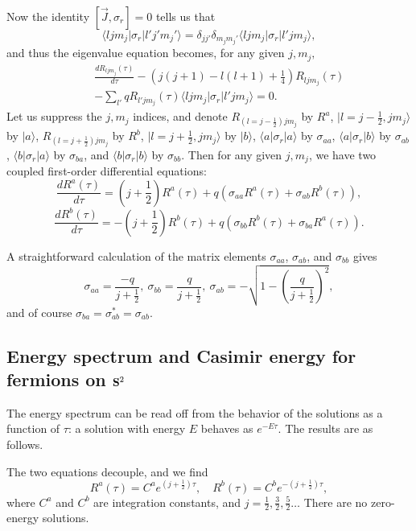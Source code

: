 \documentclass[a4paper,12pt, amsfonts, amssymb]{article}
\begin{document}
Now the identity $\left[\vec{J}, \sigma_r\right]=0$ tells us that
\begin{equation*}
\langle ljm_j\vert\sigma_r\vert l'j'm_j'\rangle= 
\delta_{jj'}\delta_{m_jm_j'}\langle ljm_j\vert\sigma_r\vert l'jm_j\rangle,
\end{equation*}
and thus the eigenvalue equation becomes, for any given $j,m_j,$
\begin{eqnarray}
&\ &
\frac{dR_{ljm_j}(\tau)}{d\tau}-\left(j(j+1)-l(l+1)
+\frac{1}{4}\right)R_{ljm_j}(\tau) \nonumber\\
&\ &- \sum_{l'}q R_{l'jm_j}(\tau)
\langle ljm_j|\sigma_r|l'jm_j\rangle  =0.\nonumber
\end{eqnarray}
Let us suppress the $j,m_j$ indices, and denote 
$R_{(l=j-\frac{1}{2})jm_j}$ by $R^a$, 
$\vert l=j-\frac{1}{2},jm_j\rangle$ by $\vert a\rangle$, $R_{(l=j+\frac{1}{2})jm_j}$ by $R^b$, $\vert l=j+\frac{1}{2},jm_j\rangle$  
by $\vert b\rangle$, $\langle a\vert \sigma_r\vert a\rangle$ by 
$\sigma_{aa}$, $\langle a\vert\sigma_r\vert b\rangle$ by $\sigma_{ab}$,
$\langle b\vert\sigma_r\vert a\rangle$ by 
$\sigma_{ba}$, and $\langle b\vert\sigma_r\vert b\rangle$ by $\sigma_{bb}$. Then for any given 
$j,m_j$, we have two coupled first-order differential equations:
$$
\frac{dR^a(\tau)}{d\tau}=\left(j+\frac{1}{2}\right)R^a(\tau)
+q(\sigma_{aa}R^a(\tau)+\sigma_{ab}R^b(\tau)),
$$
$$
\frac{dR^b(\tau)}{d\tau}=-\left(j+\frac{1}{2}\right)R^b(\tau)
+q(\sigma_{bb}R^b(\tau)+\sigma_{ba}R^a(\tau)).
$$

A straightforward calculation of the matrix elements $\sigma_{aa}$, $\sigma_{ab}$, and $\sigma_{bb}$ gives 
\begin{equation*}
\sigma_{aa}=\frac{-q}{j+\frac{1}{2}},\ 
\sigma_{bb}=\frac{q}{j+\frac{1}{2}},\ 
\sigma_{ab}=-\sqrt{1-\left(\frac{q}{j+\frac{1}{2}} \right)^2}, 
\end{equation*}
and of course $\sigma_{ba}=\sigma_{ab}^*=\sigma_{ab}$.

\subsection*{Energy spectrum and Casimir energy for fermions on ${\bf S}^2$}

The energy spectrum can be read off from the behavior of the solutions
as a function of $\tau$: a solution with energy $E$ behaves as $e^{-E\tau}.$
The results are as follows.


The two equations decouple, and we find 
$$
R^a(\tau)=C^ae^{(j+\frac{1}{2})\tau},\quad R^b(\tau)=
C^be^{-(j+\frac{1}{2})\tau},
$$
where $C^a$ and  $C^b$ are integration constants, and 
$j=\frac{1}{2},\frac{3}{2},\frac{5}{2}\dots$ 
There are no zero-energy solutions.
\end{document}
